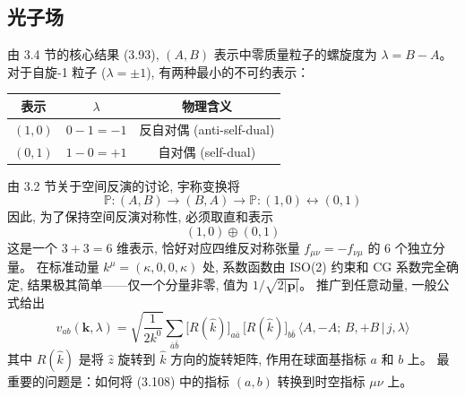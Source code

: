 
\subsection{光子场}
由 3.4 节的核心结果 (3.93), $(A,B)$ 表示中零质量粒子的螺旋度为 $\lambda = B - A$。
对于自旋-1 粒子 ($\lambda = \pm 1$), 有两种最小的不可约表示：
\begin{center}
\begin{tabular}{c c c}
\hline
表示 & $\lambda$ & 物理含义 \\
\hline
$(1,0)$ & $0-1=-1$ & 反自对偶 (anti-self-dual) \\
$(0,1)$ & $1-0=+1$ & 自对偶 (self-dual) \\
\hline
\end{tabular}
\end{center}
由 3.2 节关于空间反演的讨论, 宇称变换将 
$$\mathbb{P}:(A,B) \to (B,A)\to\mathbb{P}: (1,0) \leftrightarrow (0,1)$$
因此, 为了保持空间反演对称性, 必须取直和表示
\begin{equation}
    (1,0) \oplus (0,1)
\end{equation}
这是一个 $3+3=6$ 维表示, 恰好对应四维反对称张量 $f_{\mu\nu} = -f_{\nu\mu}$ 的 6 个独立分量。
在标准动量 $k^\mu=(\kappa,0,0,\kappa)$ 处, 系数函数由 ISO(2) 约束和 CG 系数完全确定,
结果极其简单——仅一个分量非零, 值为 $1/\sqrt{2|\boldsymbol{p}|}$。
推广到任意动量, 一般公式给出
\begin{equation}
    v_{ab}(\mathbf{k},\lambda) = \sqrt{\frac{1}{2k^0}}
    \sum_{\bar{a}\bar{b}}
    \bigl[R(\hat{k})\bigr]_{a\bar{a}}\,
    \bigl[R(\hat{k})\bigr]_{b\bar{b}}\,
    \langle A,-A;\,B,+B\,|\,j,\lambda\rangle
    \tag{3.108}
\end{equation}
其中 $R(\hat{k})$ 是将 $\hat{z}$ 旋转到 $\hat{k}$ 方向的旋转矩阵,
作用在球面基指标 $a$ 和 $b$ 上。
最重要的问题是：如何将 (3.108) 中的指标 $(a,b)$ 转换到时空指标 $\mu\nu$ 上。


